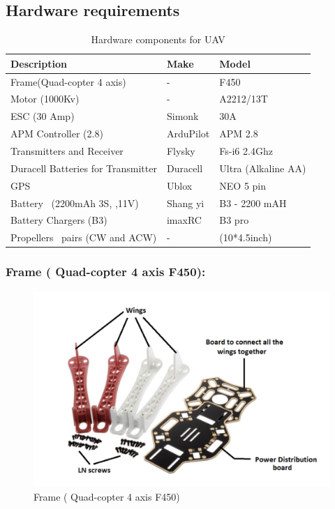 \newpage
\subsection{Hardware requirements}
\begin{table}[h!]
\centering
\begin{tabular}{|l|l|l|} 
\hline
\textbf{Description}               & \textbf{Make~} & \textbf{Model}       \\ 
\hline
Frame(Quad-copter 4 axis)          & -              & F450                 \\ 
\hline
Motor (1000Kv)                     & -              & A2212/13T            \\ 
\hline
ESC (30 Amp)                       & Simonk         & 30A                  \\ 
\hline
APM Controller (2.8)               & ArduPilot      & APM 2.8              \\ 
\hline
Transmitters and Receiver~         & Flysky~        & Fs-i6 2.4Ghz         \\ 
\hline
Duracell Batteries for Transmitter & Duracell       & Ultra (Alkaline AA)  \\ 
\hline
GPS                                & Ublox~         & NEO 5 pin            \\ 
\hline
Battery~ (2200mAh 3S, ,11V)        & Shang yi       & B3 - 2200 mAH        \\ 
\hline
Battery Chargers (B3)              & imaxRC         & B3 pro~              \\ 
\hline
Propellers~ pairs (CW and ACW)     & -              & (10*4.5inch)         \\
\hline
\end{tabular}
\caption{Hardware components for UAV}
\end{table}

\subsubsection{Frame ( Quad-copter 4 axis F450):}
\begin{figure}[h!]
\centering
\includegraphics[width=\columnwidth]{./Figures/frame_qc.png}
\caption{Frame ( Quad-copter 4 axis F450)}
\label{frame_qc}
\end{figure}

